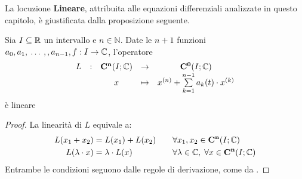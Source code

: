 La locuzione \textbf{Lineare}, attribuita alle equazioni differenziali analizzate in questo capitolo, è giustificata dalla proposizione seguente.
\begin{proposition}
	\label{prop:linearita_eq_diff}
	Sia $I\subseteq \mathbb{R}$ un intervallo e $n\in\mathbb{N}$. Date le $n+1$ funzioni $a_0,a_1,\:\dotsc\:,,a_{n-1},f:I\to\mathbb{C}$, l'operatore
	\begin{equation*}
		\begin{array}{ccccc} {L} & : & {\mathbf{C^{n}}(I;\mathbb{C})} & \to & {\mathbf{C^{0}}(I;\mathbb{C})} \\ & & {x} & \mapsto & {x^{(n)} + \sum\limits_{k=1}^{n-1}a_k(t) \cdot x^{(k)}} \\ \end{array}
	\end{equation*}
	è lineare
	\begin{proof}
		La linearità di $L$ equivale a:
		\begin{alignat*}{2}
			L(x_1+x_2) &= L(x_1)+L(x_2) &\quad&\forall x_1,x_2\in \mathbf{C^{n}}(I;\mathbb{C})\\
			L(\lambda\cdot x) &= \lambda\cdot L(x) &&\forall \lambda\in\mathbb{C},\;\forall x\in \mathbf{C^{n}}(I;\mathbb{C})
		\end{alignat*}
		Entrambe le condizioni  seguono dalle regole di derivazione, come da .
	\end{proof}
\end{proposition}

